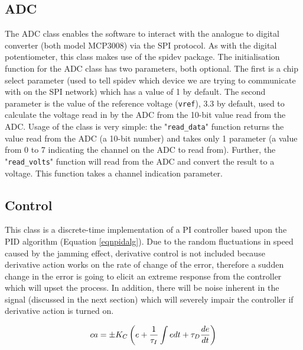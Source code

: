 \documentclass[twoside,a4]{report}
\def\br{\newline \newline \noindent}
\begin{document}
	\subsection*{ADC} %
	The ADC class enables the software to interact with the analogue to digital converter (both model MCP3008) via the SPI protocol. As with the digital potentiometer, this class makes use of the spidev package. \br
	The initialisation function for the ADC class has two parameters, both optional. The first is a chip select parameter (used to tell spidev which device we are trying to communicate with on the SPI network) which has a value of 1 by default. The second parameter is the value of the reference voltage (\texttt{vref}), 3.3 by default, used to calculate the voltage read in by the ADC from the 10-bit value read from the ADC. \br
	Usage of the class is very simple: the "\texttt{read\_data}" function returns the value read from the ADC (a 10-bit number) and takes only 1 parameter (a value from 0 to 7 indicating the channel on the ADC to read from). Further, the "\texttt{read\_volts}" function will read from the ADC and convert the result to a voltage. This function takes a channel indication parameter.
	
	\subsection*{Control} %
	This class is a discrete-time implementation of a PI controller based upon the PID algorithm (Equation \ref{eqnpidalg}). Due to the random fluctuations in speed caused by the jamming effect, derivative control is not included because derivative action works on the rate of change of the error, therefore a sudden change in the error is going to elicit an extreme response from  the controller which will upset the process. In addition, there will be noise inherent in the signal (discussed in the next section) which will severely impair the controller if derivative action is turned on. 
	
	\begin{equation}
		ca = \pm K_C \left(e + \frac{1}{\tau _I} \int e \space dt + \tau _D \frac{de}{dt}\right)
		\label{eqnpidalg}
	\end{equation}
	
	
\end{document}
